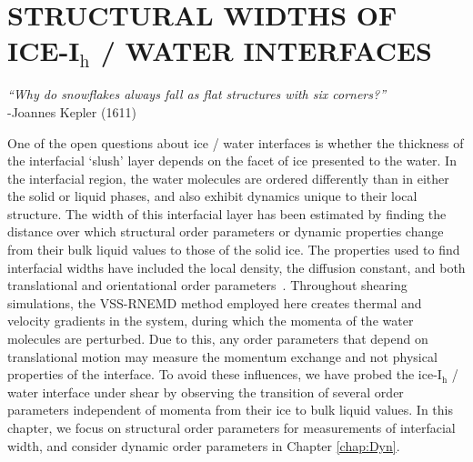 
\chapter{STRUCTURAL WIDTHS OF ICE-I$_\mathrm{h}$ / WATER
  INTERFACES}\label{chap:Str}


\begin{flushright}
\textit{``Why do snowflakes always fall as flat structures with six
  corners?''} \\
-Joannes Kepler (1611) \\
\end{flushright}

One of the open questions about ice / water interfaces is whether the
thickness of the interfacial `slush' layer depends on the facet of ice
presented to the water. In the interfacial region, the water molecules
are ordered differently than in either the solid or liquid phases, and
also exhibit dynamics unique to their local structure.  The width of
this interfacial layer has been estimated by finding the distance over
which structural order parameters or dynamic properties change from
their bulk liquid values to those of the solid ice. The properties
used to find interfacial widths have included the local density, the
diffusion constant, and both translational and orientational order
parameters~\cite{Karim1988,Karim1990,Hayward2001,Hayward2002,Bryk2002,Gay2002,Louden2013a}. Throughout
shearing simulations, the VSS-RNEMD method employed here creates
thermal and velocity gradients in the system, during which the momenta
of the water molecules are perturbed. Due to this, any order parameters that
depend on translational motion may measure the momentum exchange and
not physical properties of the interface. To avoid these influences,
we have probed the ice-I$_\mathrm{h}$ / water interface under shear by
observing the transition of several order parameters independent of
momenta from their ice to bulk liquid values.  In this chapter, we
focus on structural order parameters for measurements of interfacial
width, and consider dynamic order parameters in Chapter
\ref{chap:Dyn}.

